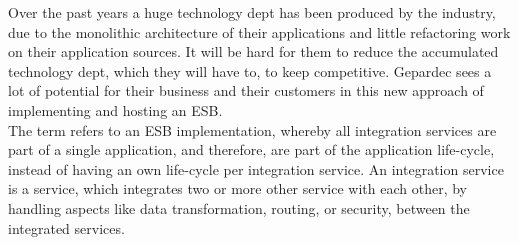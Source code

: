 Over the past years a huge technology dept has been produced by the industry, due to the monolithic architecture of their applications and little refactoring work on their application sources. It will be hard for them to reduce the accumulated technology dept, which they will have to, to keep competitive. Gepardec sees a lot of potential for their business and their customers in this new approach of implementing and hosting an ESB. \\

The term  refers to an ESB implementation, whereby all integration services are part of a single application, and therefore, are part of the application life-cycle, instead of having an own life-cycle per integration service. An integration service is a service, which integrates two or more other service with each other, by handling aspects like data transformation, routing, or security, between the integrated services.  